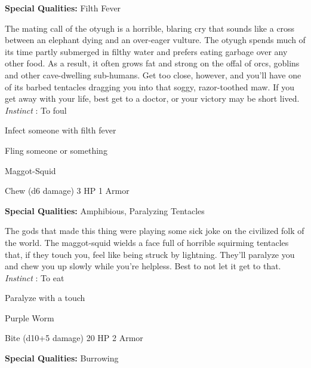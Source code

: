  
\startMonsterQualities
{\bf Special Qualities:}  Filth Fever
\stopMonsterQualities
 
\startMonsterDescription
The mating call of the otyugh is a horrible, blaring cry that sounds like a cross between an elephant dying and an over-eager vulture. The otyugh spends much of its time partly submerged in filthy water and prefers eating garbage over any other food. As a result, it often grows fat and strong on the offal of orcs, goblins and other cave-dwelling sub-humans. Get too close, however, and you’ll have one of its barbed tentacles dragging you into that soggy, razor-toothed maw. If you get away with your life, best get to a doctor, or your victory may be short lived. {\em Instinct} : To foul
\stopMonsterDescription
 
\startitemize[1,packed]

\item Infect someone with filth fever

 
\item Fling someone or something


\stopitemize
 
\startMonsterName
Maggot-Squid	 
\stopMonsterName
 

Chew (d6 damage)	3 HP	1 Armor

 


 
\startMonsterQualities
{\bf Special Qualities:}  Amphibious, Paralyzing Tentacles
\stopMonsterQualities
 
\startMonsterDescription
The gods that made this thing were playing some sick joke on the civilized folk of the world. The maggot-squid wields a face full of horrible squirming tentacles that, if they touch you, feel like being struck by lightning. They’ll paralyze you and chew you up slowly while you’re helpless. Best to not let it get to that. {\em Instinct} : To eat
\stopMonsterDescription
 
\startitemize[1,packed]

\item Paralyze with a touch


\stopitemize
 
\startMonsterName
Purple Worm	 
\stopMonsterName
 

Bite (d10+5 damage)	20 HP	2 Armor

 


 
\startMonsterQualities
{\bf Special Qualities:}  Burrowing
\stopMonsterQualities
 
